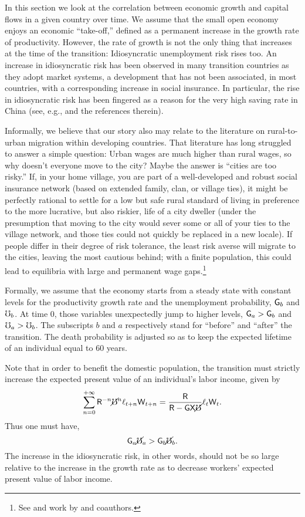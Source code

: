 \documentclass[titlepage,abstract,letterpaper]{econtex}
\begin{document}
In this section we look at the correlation between economic growth and
capital flows in a given country over time. We assume that the small
open economy enjoys an economic ``take-off,'' defined as a permanent
increase in the growth rate of productivity. However, the rate of
growth is not the only thing that increases at the time of the
transition: Idiosyncratic unemployment risk rises too. An increase in
idiosyncratic risk has been observed in many transition countries as
they adopt market systems, a development that has not been associated,
in most countries, with a corresponding increase in social
insurance. In particular, the rise in idiosyncratic risk has been
fingered as a reason for the very high saving rate in China (see,
e.g., \cite{cpChina} and the references therein).

Informally, we believe that our story also may relate to the
literature on rural-to-urban migration within developing countries.
That literature has long struggled to answer a simple question: Urban
wages are much higher than rural wages, so why doesn't everyone move
to the city?  Maybe the answer is ``cities are too risky.''  If, in
your home village, you are part of a well-developed and robust social
insurance network (based on extended family, clan, or village ties),
it might be perfectly rational to settle for a low but safe rural
standard of living in preference to the more lucrative, but also
riskier, life of a city dweller (under the presumption that moving
to the city would sever some or all of your ties to the village
network, and those ties could not quickly be replaced in a new
locale).  If people differ in their degree of risk tolerance, the
least risk averse will migrate to the cities, leaving the most
cautious behind; with a finite population, this could lead to equilibria
with large and permanent wage gaps.\footnote{See \cite{mrMobilityIndia} and
  work by \cite{townsendIndia} and coauthors.}

Formally, we assume that the economy starts from a steady state with
constant levels for the productivity growth rate and the unemployment
probability, $\mathsf{G}_b$ and $\mho_b$. At time $0$, those variables
unexpectedly jump to higher levels, $\mathsf{G}_a > \mathsf{G}_b$ and $\mho_a
> \mho_b$. The subscripts $b$ and $a$ respectively stand for
``before'' and ``after'' the transition. The death probability is
adjusted so as to keep the expected lifetime of an individual equal to
60 years.

Note that in order to benefit the domestic population, the transition must strictly increase the expected present value of an individual's labor income, given by
\begin{equation*}
\sum_{n=0}^{+\infty} \mathsf{R}^{-n} \cancel{\mho}^{n} \ell_{t+n} \mathsf{W}_{t+n}= \frac{\mathsf{R}}{\mathsf{R}- \mathsf{G} \mathsf{X} \cancel{\mho}} \ell_t \mathsf{W}_t.
\end{equation*}
Thus one must have,
\begin{equation}
\mathsf{G}_a \cancel{\mho}_a >\mathsf{G}_b \cancel{\mho}_b.
\label{eq:CondTransdyn}
\end{equation}
The increase in the idiosyncratic risk, in other words, should not be so large relative to the increase in the growth rate as to decrease workers' expected present value of labor income.
\end{document}
